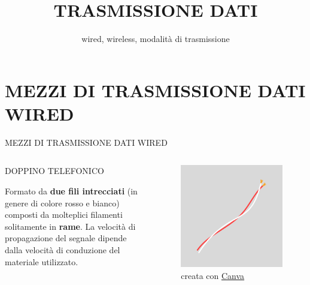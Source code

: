 \documentclass[aspectratio=1610]{beamer}
\title{TRASMISSIONE DATI}
\subtitle{wired, wireless, modalità di trasmissione}
\date{}
\institute{\textit{
        Fonti:
        \begin{itemize}
            \item[-] \href{https://it.wikipedia.org/wiki/FTTx}{Wikipedia}
            \item[-] \href{https://www.edises.it/concorsi/scienze-e-tecnologie-informatiche-2020.html}{Manuale scienze e tecnologie informatiche}
        \end{itemize}
    }
}
\begin{document}
\begin{frame}
    \titlepage
\end{frame}


\section{MEZZI DI TRASMISSIONE DATI WIRED}

\begin{frame}{MEZZI DI TRASMISSIONE DATI WIRED}
    \begin{columns}
        \begin{alertblock}{DOPPINO TELEFONICO}
            \begin{minipage}{0.97\linewidth}
                \justifying
                Formato da \textbf{due fili intrecciati} (in genere di colore rosso e bianco) composti da 
                molteplici filamenti solitamente in \textbf{rame}. La velocità di propagazione del segnale 
                dipende dalla velocità di conduzione del materiale utilizzato.
            \end{minipage}
        \end{alertblock}
           \begin{figure}
               \includegraphics[width=\linewidth]{img/doppino_telefonico.png}
               \caption{{creata con \href{https://www.canva.com/}{Canva}}}
           \end{figure}
    \end{columns}
\end{frame}
\end{document}
